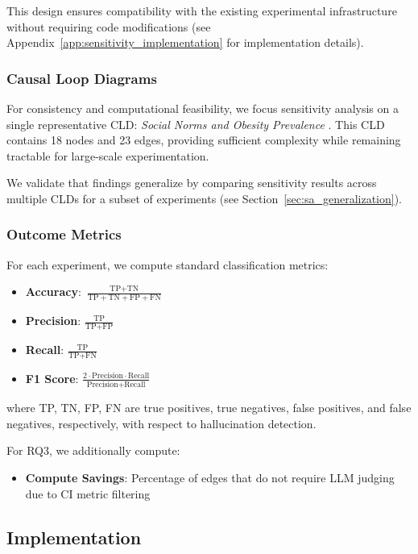 This design ensures compatibility with the existing experimental infrastructure without requiring code modifications (see Appendix~\ref{app:sensitivity_implementation} for implementation details).

\subsubsection{Causal Loop Diagrams}

For consistency and computational feasibility, we focus sensitivity analysis on a single representative CLD: \emph{Social Norms and Obesity Prevalence} \citep{karanfil2008social}. This CLD contains 18 nodes and 23 edges, providing sufficient complexity while remaining tractable for large-scale experimentation.

We validate that findings generalize by comparing sensitivity results across multiple CLDs for a subset of experiments (see Section~\ref{sec:sa_generalization}).

\subsubsection{Outcome Metrics}

For each experiment, we compute standard classification metrics:

\begin{itemize}
    \item \textbf{Accuracy}: $\frac{\text{TP} + \text{TN}}{\text{TP} + \text{TN} + \text{FP} + \text{FN}}$
    \item \textbf{Precision}: $\frac{\text{TP}}{\text{TP} + \text{FP}}$
    \item \textbf{Recall}: $\frac{\text{TP}}{\text{TP} + \text{FN}}$
    \item \textbf{F1 Score}: $\frac{2 \cdot \text{Precision} \cdot \text{Recall}}{\text{Precision} + \text{Recall}}$
\end{itemize}

where TP, TN, FP, FN are true positives, true negatives, false positives, and false negatives, respectively, with respect to hallucination detection.

For RQ3, we additionally compute:
\begin{itemize}
    \item \textbf{Compute Savings}: Percentage of edges that do not require LLM judging due to CI metric filtering
\end{itemize}

\subsection{Implementation}

